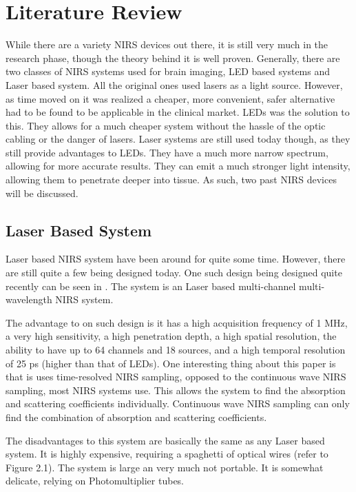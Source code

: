 \chapter{Literature Review}

While there are a variety NIRS devices out there, it is still very much in the research phase, though the theory behind it is well proven. Generally, there are two classes of NIRS systems used for brain imaging, LED based systems and Laser based system. All the original ones used lasers as a light source. However, as time moved on it was realized a cheaper, more convenient, safer alternative had to be found to be applicable in the clinical market. LEDs was the solution to this. They allows for a much cheaper system without the hassle of the optic cabling or the danger of lasers. Laser systems are still used today though, as they still provide advantages to LEDs. They have a much more narrow spectrum, allowing for more accurate results. They can emit a much stronger light intensity, allowing them to penetrate deeper into tissue. As such, two past NIRS devices will be discussed.

\section{Laser Based System}

Laser based NIRS system have been around for quite some time. However, there are still quite a few being designed today. One such design being designed quite recently can be seen in \cite{tor08}. The system is an Laser based multi-channel multi-wavelength NIRS system.

The advantage to on such design is it has a high acquisition frequency of 1 MHz, a very high sensitivity, a high penetration depth, a high spatial resolution, the ability to have up to 64 channels and 18 sources, and a high temporal resolution of 25 ps (higher than that of LEDs). One interesting thing about this paper is that is uses time-resolved NIRS sampling, opposed to the continuous wave NIRS sampling, most NIRS systems use. This allows the system to find the absorption and scattering coefficients individually. Continuous wave NIRS sampling can only find the combination of absorption and scattering coefficients.

The disadvantages to this system are basically the same as any Laser based system. It is highly expensive, requiring a spaghetti of optical wires (refer to Figure 2.1). The system is large an very much not portable. It is somewhat delicate, relying on Photomultiplier tubes.

